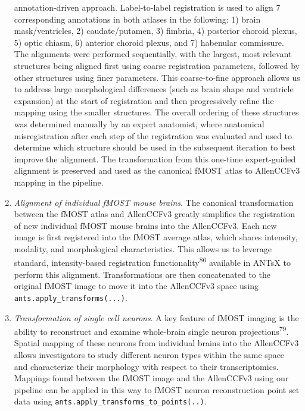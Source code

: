 \documentclass[
  12pt,
]{article}
\begin{document}
\begin{enumerate}
  annotation-driven approach. Label-to-label registration is used to
  align 7 corresponding annotations in both atlases in the following: 1)
  brain mask/ventricles, 2) caudate/putamen, 3) fimbria, 4) posterior
  choroid plexus, 5) optic chiasm, 6) anterior choroid plexus, and 7)
  habenular commissure. The alignments were performed sequentially, with
  the largest, most relevant structures being aligned first using coarse
  registration parameters, followed by other structures using finer
  parameters. This coarse-to-fine approach allows us to address large
  morphological differences (such as brain shape and ventricle
  expansion) at the start of registration and then progressively refine
  the mapping using the smaller structures. The overall ordering of
  these structures was determined manually by an expert anatomist, where
  anatomical misregistration after each step of the registration was
  evaluated and used to determine which structure should be used in the
  subsequent iteration to best improve the alignment. The transformation
  from this one-time expert-guided alignment is preserved and used as
  the canonical fMOST atlas to AllenCCFv3 mapping in the pipeline.
\item
  \emph{Alignment of individual fMOST mouse brains}. The canonical
  transformation between the fMOST atlas and AllenCCFv3 greatly
  simplifies the registration of new individual fMOST mouse brains into
  the AllenCCFv3. Each new image is first registered into the fMOST
  average atlas, which shares intensity, modality, and morphological
  characteristics. This allows us to leverage standard, intensity-based
  registration functionality\textsuperscript{86} available in ANTsX to
  perform this alignment. Transformations are then concatenated to the
  original fMOST image to move it into the AllenCCFv3 space using
  \texttt{ants.apply\_transforms(...)}.
\item
  \emph{Transformation of single cell neurons}. A key feature of fMOST
  imaging is the ability to reconstruct and examine whole-brain single
  neuron projections\textsuperscript{79}. Spatial mapping of these
  neurons from individual brains into the AllenCCFv3 allows
  investigators to study different neuron types within the same space
  and characterize their morphology with respect to their
  transcriptomics. Mappings found between the fMOST image and the
  AllenCCFv3 using our pipeline can be applied in this way to fMOST
  neuron reconstruction point set data using
  \texttt{ants.apply\_transforms\_to\_points(..)}.
\end{enumerate}
\end{document}
